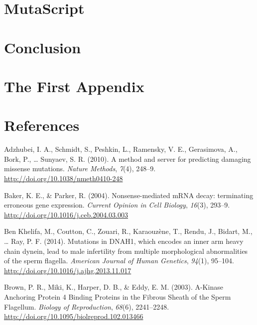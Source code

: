 \documentclass[12pt,twoside]{reedthesis}
\theoremstyle{definition}
\theoremstyle{definition}
\theoremstyle{remark}
\begin{document}
  \newpage  
  
  \chapter{MutaScript}\label{mutascript}
  
  \chapter*{Conclusion}\label{conclusion-1}
  
  \chapter{The First Appendix}\label{the-first-appendix}
  
  \chapter*{References}\label{references}
  
  \hypertarget{refs}{}
  \hypertarget{ref-Adzhubei2010}{}
  Adzhubei, I. A., Schmidt, S., Peshkin, L., Ramensky, V. E., Gerasimova,
  A., Bork, P., \ldots{} Sunyaev, S. R. (2010). A method and server for
  predicting damaging missense mutations. \emph{Nature Methods},
  \emph{7}(4), 248--9. \url{http://doi.org/10.1038/nmeth0410-248}
  
  \hypertarget{ref-Baker2004}{}
  Baker, K. E., \& Parker, R. (2004). Nonsense-mediated mRNA decay:
  terminating erroneous gene expression. \emph{Current Opinion in Cell
  Biology}, \emph{16}(3), 293--9.
  \url{http://doi.org/10.1016/j.ceb.2004.03.003}
  
  \hypertarget{ref-BenKhelifa2014}{}
  Ben Khelifa, M., Coutton, C., Zouari, R., Karaouzène, T., Rendu, J.,
  Bidart, M., \ldots{} Ray, P. F. (2014). Mutations in DNAH1, which
  encodes an inner arm heavy chain dynein, lead to male infertility from
  multiple morphological abnormalities of the sperm flagella.
  \emph{American Journal of Human Genetics}, \emph{94}(1), 95--104.
  \url{http://doi.org/10.1016/j.ajhg.2013.11.017}
  
  \hypertarget{ref-Brown2003}{}
  Brown, P. R., Miki, K., Harper, D. B., \& Eddy, E. M. (2003). A-Kinase
  Anchoring Protein 4 Binding Proteins in the Fibrous Sheath of the Sperm
  Flagellum. \emph{Biology of Reproduction}, \emph{68}(6), 2241--2248.
  \url{http://doi.org/10.1095/biolreprod.102.013466}
  
\end{document}
